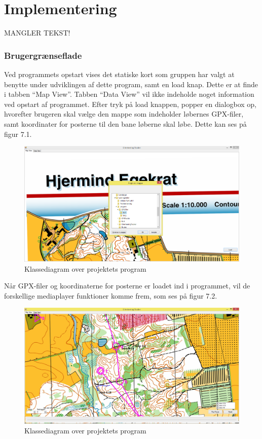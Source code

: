 \chapter{Implementering}
MANGLER TEKST!

\subsection{Brugergrænseflade}
Ved programmets opstart vises det statiske kort som gruppen har valgt at benytte under udviklingen af dette program, samt en load knap. Dette er at finde i tabben “Map View”. Tabben “Data View” vil ikke indeholde noget information ved opstart af programmet. Efter tryk på load knappen, popper en dialogbox op, hvorefter brugeren skal vælge den mappe som indeholder løbernes GPX-filer, samt koordinater for posterne til den bane løberne skal løbe. Dette kan ses på figur 7.1.

\begin{figure} [h]
	\centering
	\includegraphics[width=1\textwidth]{billeder/MapView1}
	\caption{Klassediagram over projektets program}
\end{figure}

Når GPX-filer og koordinaterne for posterne er loadet ind i programmet, vil de forskellige mediaplayer funktioner komme frem, som ses på figur 7.2.

\begin{figure} [h]
	\centering
	\includegraphics[width=1\textwidth]{billeder/MapView2}
	\caption{Klassediagram over projektets program}
\end{figure}

